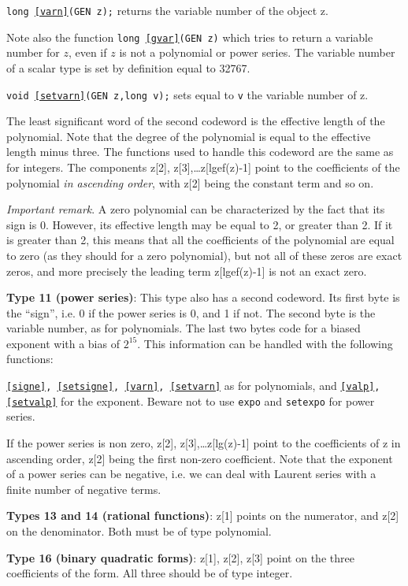 {\tt long \ref{varn}(GEN z);} returns the variable number of the object z.

Note also the function {\tt long \ref{gvar}(GEN z)} which tries to return a variable number
for $z$, even if $z$ is not a polynomial or power series. The variable number of
a scalar type is set by definition equal to 32767.

{\tt void \ref{setvarn}(GEN z,long v);} sets equal to {\tt v} the variable number of z.

The least significant word of the second codeword is the effective length of
the polynomial. Note that the degree of the polynomial is equal to the effective
length minus three. The functions used to handle this codeword are the same
as for integers. The components z[2], z[3],\dots z[lgef(z)-1]
point to the coefficients of the polynomial {\it in ascending order\/}, with
z[2] being the constant term and so on.

{\sl Important remark\/}. A zero polynomial can be characterized by the fact
that its sign is 0. However, its effective length may be equal to 2, or greater
than 2. If it is greater than 2, this means that all the coefficients of the
polynomial are equal to zero (as they should for a zero polynomial), but not
all of these zeros are exact zeros, and more precisely the leading term
z[lgef(z)-1] is not an exact zero.

{\bf Type 11 (power series)}: 
This type also has a second codeword.
Its first byte is the ``sign'', i.e. 0 if the power series
is 0, and 1 if not. The second byte is the variable number, as for polynomials.
The last two bytes code for a biased exponent with a bias of
$2^{15}$. This information can be handled with the following functions:

{\tt \ref{signe}, \ref{setsigne}, \ref{varn}, \ref{setvarn}} as for 
polynomials, and {\tt \ref{valp}, \ref{setvalp}} for
the exponent. Beware not to use {\tt expo} and {\tt setexpo} for power series.

If the power series is non zero, z[2], z[3],\dots z[lg(z)-1] point to the
coefficients of z in ascending order, z[2] being the first non-zero coefficient.
Note that the exponent of a power series can be negative, i.e. we can deal with
Laurent series with a finite number of negative terms.

{\bf Types 13 and 14 (rational functions)}: 
z[1] points on the numerator, and z[2]
on the denominator. Both must be of type polynomial.

{\bf Type 16 (binary quadratic forms)}: 
z[1], z[2], z[3] point on the three
coefficients of the form. All three should be of type integer.

